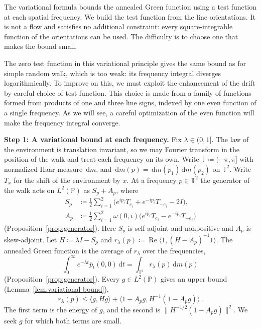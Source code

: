 \documentclass[11pt]{amsart}
\theoremstyle{plain}
\theoremstyle{definition}
\newcommand{\T}{\mathbb T}
\renewcommand{\P}{\mathbb P}
\newcommand{\1}{\mathbf 1}
\newcommand{\ip}[2]{\langle #1,#2\rangle}
\newcommand{\norm}[1]{\lVert #1\rVert}
\newcommand{\dd}{\,\mathrm d}
\begin{document}
	The variational formula bounds the annealed Green function using a test
	function at each spatial frequency.  We build the test function from the
	line orientations.  It is not a flow and satisfies no additional constraint:
	every square-integrable function of the orientations can be used.
	The difficulty is to choose one that makes the bound small.
	
	The zero test function in this variational principle gives the same bound as for simple random walk, which is too weak: its
	frequency integral diverges logarithmically. To improve on this, we must exploit the enhancement of the drift by careful choice of test function.  
	This choice is made from a family of functions formed from products of one and three line signs, indexed by one even function of a single
	frequency. As we will see, a careful optimization of the even function will make the frequency integral converge. 
	
	
	\medskip
	\noindent\textbf{Step 1: A variational bound at each frequency.}
	Fix $\lambda\in(0,1]$.  The law of the environment is translation invariant,
	so we may Fourier transform in the position of the walk and treat each
	frequency on its own.  Write $\T\coloneqq(-\pi,\pi]$ with normalized Haar measure
	$\dd m$, and $\dd m(p)=\dd m(p_1)\dd m(p_2)$ on $\T^2$.  Write $T_x$ for the shift of the
	environment by $x$.  At a frequency $p\in\T^2$ the generator of the walk acts on
	$L^2(\P)$ as $S_p+A_p$, where
	\begin{align*}
		S_p&\coloneqq\frac12\sum_{i=1}^2
		\bigl(e^{ip_i}T_{e_i}+e^{-ip_i}T_{-e_i}-2I\bigr),\\
		A_p&\coloneqq\frac12\sum_{i=1}^2\omega(0,i)
		\bigl(e^{ip_i}T_{e_i}-e^{-ip_i}T_{-e_i}\bigr)
	\end{align*}
	(Proposition~\ref{prop:generator}).  Here $S_p$ is self-adjoint and
	nonpositive and $A_p$ is skew-adjoint.  Let $H\coloneqq\lambda I-S_p$ and
	$r_\lambda(p)\coloneqq\operatorname{Re}\ip1{(H-A_p)^{-1}1}$. The annealed Green function is the
	average of $r_\lambda$ over the frequencies,
	\[
	\int_0^\infty e^{-\lambda t}\overline p_t(0,0)\dd t
	=\int_{\T^2}r_\lambda(p)\dd m(p)
	\]
	(Proposition~\ref{prop:generator}).  Every $g\in L^2(\P)$ gives an upper
	bound (Lemma~\ref{lem:variational-bound}),
	\begin{equation}\label{eq:overview-bound}
		r_\lambda(p)\leq
		\ip g{Hg}+\ip{1-A_pg}{H^{-1}(1-A_pg)}\, .
	\end{equation}
	The first term is the energy of $g$, and the second is
	$\norm{H^{-1/2}(1-A_pg)}^2$.  We seek $g$ for which both terms are small.
	
\end{document}
